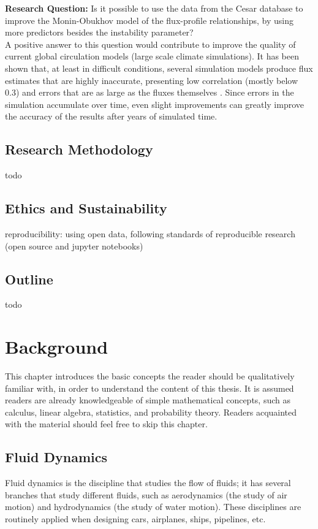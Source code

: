 \documentclass[12pt]{book}
\begin{document}
\textbf{Research Question:} Is it possible to use the data from the Cesar database to improve the Monin-Obukhov model of the flux-profile relationships, by using more predictors besides the instability parameter? \\

A positive answer to this question would contribute to improve the quality of current global circulation models (large scale climate simulations). It has been shown that, at least in difficult conditions, several simulation models produce flux estimates that are highly inaccurate, presenting low correlation (mostly below 0.3) and errors that are as large as the fluxes themselves \cite{sheba}. Since errors in the simulation accumulate over time, even slight improvements can greatly improve the accuracy of the results after years of simulated time.

\section{Research Methodology}
todo

\section{Ethics and Sustainability}

reproducibility: using open data, following standards of reproducible research (open source and jupyter notebooks)

\section{Outline}
todo

\chapter{Background}
This chapter introduces the basic concepts the reader should be qualitatively familiar with, in order to understand the content of this thesis. It is assumed readers are already knowledgeable of simple mathematical concepts, such as calculus, linear algebra, statistics, and probability theory. Readers acquainted with the material should feel free to skip this chapter.

\section{Fluid Dynamics}
Fluid dynamics is the discipline that studies the flow of fluids; it has several branches that study different fluids, such as aerodynamics (the study of air motion) and hydrodynamics (the study of water motion). These disciplines are routinely applied when designing cars, airplanes, ships, pipelines, etc.
\end{document}
